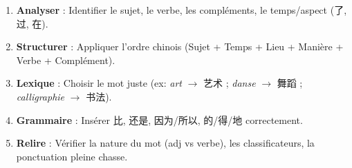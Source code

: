 \documentclass[11pt]{article}
\begin{document}
\begin{methode}
\begin{enumerate}
\item \textbf{Analyser} : Identifier le sujet, le verbe, les compléments, le temps/aspect (了, 过, 在).
\item \textbf{Structurer} : Appliquer l'ordre chinois (Sujet + Temps + Lieu + Manière + Verbe + Complément).
\item \textbf{Lexique} : Choisir le mot juste (ex: \emph{art} $\rightarrow$ 艺术 ; \emph{danse} $\rightarrow$ 舞蹈 ; \emph{calligraphie} $\rightarrow$ 书法).
\item \textbf{Grammaire} : Insérer 比, 还是, 因为/所以, 的/得/地 correctement.
\item \textbf{Relire} : Vérifier la nature du mot (adj vs verbe), les classificateurs, la ponctuation pleine chasse.
\end{enumerate}
\end{methode}
\end{document}
